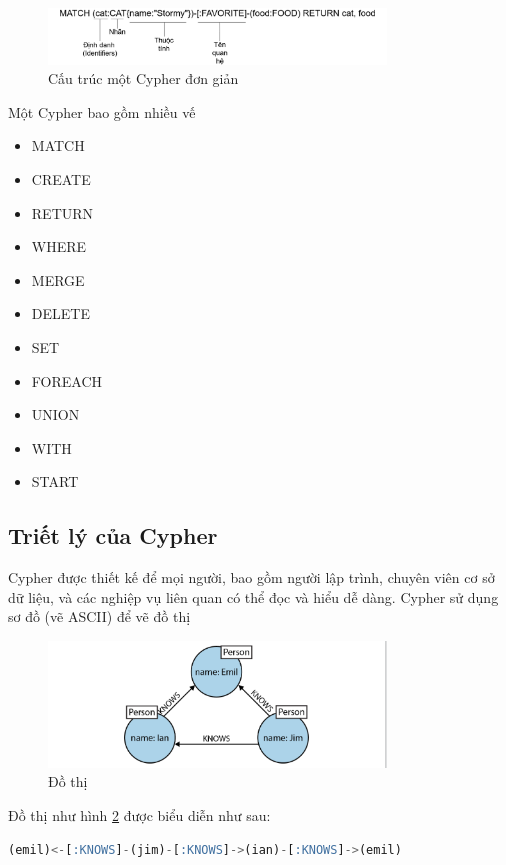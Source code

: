 \begin{figure}[h]
\centering
\includegraphics[width=0.8\textwidth]{image/chap2cypher.png}
\caption{\label{fig:cypher} Cấu trúc một Cypher đơn giản }
\end{figure}

Một Cypher bao gồm nhiều vế 
\begin{itemize}
\item MATCH 
\item CREATE 
\item RETURN
\item WHERE
\item MERGE
\item DELETE
\item SET
\item FOREACH 
\item UNION
\item WITH 
\item START
\end{itemize}

\subsection{Triết lý của Cypher}
\label{sec:cypherpil}
Cypher được thiết kế để mọi người, bao gồm người lập trình, chuyên viên cơ sở dữ liệu, và các nghiệp vụ liên quan có thể đọc và hiểu dễ dàng. Cypher sử dụng sơ đồ (vẽ ASCII) để vẽ đồ thị

\begin{figure}[h]
\centering
\includegraphics[width=0.8\textwidth]{image/chap3graphdiagram.png}
\caption{\label{fig:graphdiagram} Đồ thị}
\end{figure}

Đồ thị như hình \ref{fig:graphdiagram} được biểu diễn như sau: 

\begin{lstlisting}[caption={Cypher}, label={lst:cypherjim1}, language=SQL]
(emil)<-[:KNOWS]-(jim)-[:KNOWS]->(ian)-[:KNOWS]->(emil) 
\end{lstlisting}

